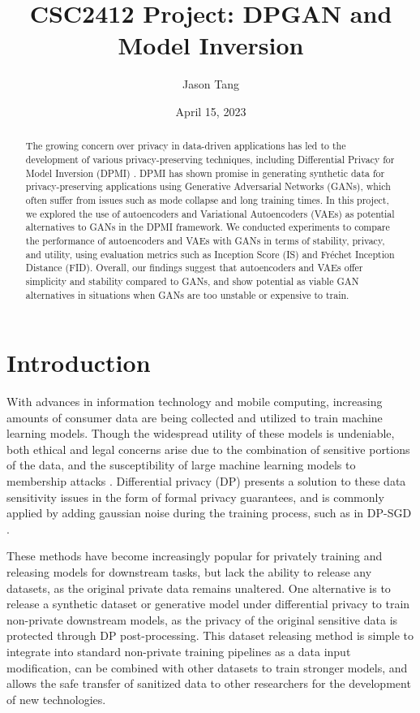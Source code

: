 \documentclass{article}
\title{CSC2412 Project: DPGAN and Model Inversion}
\author{Jason Tang}
\date{April 15, 2023}
\begin{document}
\maketitle

\begin{abstract}
    The growing concern over privacy in data-driven applications has led to the development of various privacy-preserving techniques, including Differential Privacy for Model Inversion (DPMI) \cite{dpmi}. DPMI has shown promise in generating synthetic data for privacy-preserving applications using Generative Adversarial Networks (GANs), which often suffer from issues such as mode collapse and long training times. In this project, we explored the use of autoencoders and Variational Autoencoders (VAEs) as potential alternatives to GANs in the DPMI framework. We conducted experiments to compare the performance of autoencoders and VAEs with GANs in terms of stability, privacy, and utility, using evaluation metrics such as Inception Score (IS) and Fréchet Inception Distance (FID). Overall, our findings suggest that autoencoders and VAEs offer simplicity and stability compared to GANs, and show potential as viable GAN alternatives in situations when GANs are too unstable or expensive to train.
\end{abstract}

\section{Introduction}

\parindent=20pt With advances in information technology and mobile computing, increasing amounts of consumer data are being collected and utilized to train machine learning models. Though the widespread utility of these models is undeniable, both ethical and legal concerns arise due to the combination of sensitive portions of the data, and the susceptibility of large machine learning models to membership attacks \cite{mi_attack}. Differential privacy (DP) presents a solution to these data sensitivity issues in the form of formal privacy guarantees, and is commonly applied by adding gaussian noise during the training process, such as in DP-SGD \cite{dpsgd}. 

These methods have become increasingly popular for privately training and releasing models for downstream tasks, but lack the ability to release any datasets, as the original private data remains unaltered. One alternative is to release a synthetic dataset or generative model under differential privacy to train non-private downstream models, as the privacy of the original sensitive data is protected through DP post-processing. This dataset releasing method is simple to integrate into standard non-private training pipelines as a data input modification, can be combined with other datasets to train stronger models, and allows the safe transfer of sanitized data to other researchers for the development of new technologies.
\end{document}
